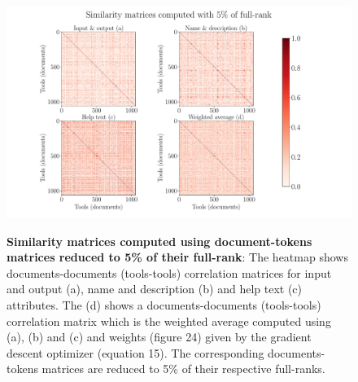 \begin{figure}[h]
\begin{centering}
    {\includegraphics[scale=0.4]{figures/Similarity_matrices_005.pdf}}
    \caption[Similarity matrices computed using document-tokens matrices reduced to 5\% of their full-rank]{\textbf{Similarity matrices computed using document-tokens matrices reduced to 5\% of their full-rank}: The heatmap shows documents-documents (tools-tools) correlation matrices for input and output (a), name and description (b) and help text (c) attributes. The (d) shows a documents-documents (tools-tools) correlation matrix which is the weighted average computed using (a), (b) and (c) and weights (figure 24) given by the gradient descent optimizer (equation 15). The corresponding documents-tokens matrices are reduced to 5\% of their respective full-ranks.}
\end{centering}
\end{figure}

